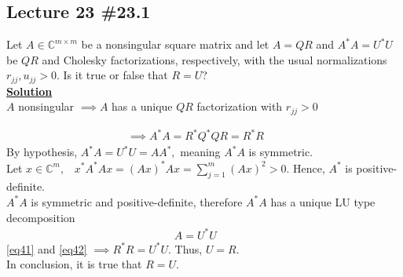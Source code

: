 \documentclass[11pt]{article}
\begin{document}
\subsection*{Lecture 23 \#23.1}
Let $A \in \mathbb{C}^{m \times m}$ be a nonsingular square matrix and let $A = QR$ and $A^*A = U^*U$ be $QR$ and Cholesky factorizations, respectively, with the usual normalizations $r_{jj}, u_{jj} > 0$. Is it true or false that $R = U$?\\
\underline{\textbf{Solution}}\\
$A$ nonsingular $\implies A$  has a unique $QR$ factorization with $r_{jj}>0$

\begin{align} 
\implies
A^*A = R^*Q^*QR = R^*R \tag{*}\label{eq41}   && 
\end{align}
By hypothesis, $A^*A = U^*U = AA^*,$  meaning $A^*A$ is symmetric.\\
Let $x \in \mathbb{C}^m, \;\;\;x^*A^*A x = (Ax)^*Ax = \sum\limits_{j=1}^m{(Ax)^2} >0$. Hence, $ A^*$ is positive-definite.\\
$A^*A$ is symmetric and positive-definite, therefore $A^*A$ has a unique LU type decomposition 
\begin{align}
A= U^*U \tag{**}\label{eq42} &&
\end{align}
\eqref{eq41} and \eqref{eq42} $\implies R^*R = U^*U$. Thus, $U = R$. \\
In conclusion, it is true that $R= U$.
\end{document}
